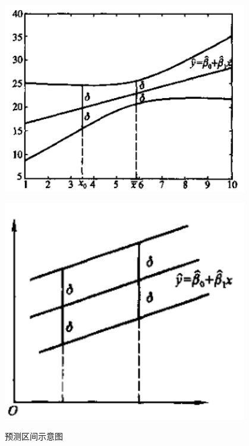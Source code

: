 \begin{figure}[htb!]
	\begin{minipage}[h]{0.47\textwidth}
		\centering
		\includegraphics[width=0.95\textwidth]{figure/8-4-2-1.png}\label{fig:8.4.2.a}
	\end{minipage}
	\begin{minipage}[h]{0.47\textwidth}
		\centering
		\includegraphics[width=0.95\textwidth]{figure/8-4-2-2.png}\label{fig:8.4.2.b}
	\end{minipage}
	\caption{预测区间示意图}\label{fig:8.4.2}
\end{figure}

